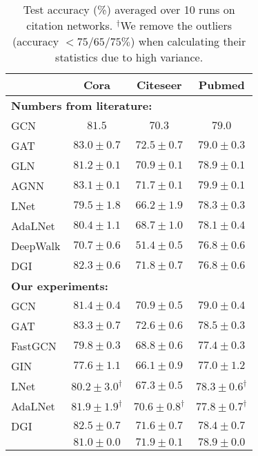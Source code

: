 \begin{table}[htb!]
\centering
        \small
        \caption{Test accuracy (\%) averaged over 10 runs on citation networks. $^\dagger$We remove the outliers (accuracy $< 75/65/75 \%$) when calculating their statistics due to high variance.}
        \label{table:citation-base}
        \begin{tabular}{l|c|c|c}
        \toprule
         & Cora & Citeseer & Pubmed \\ 
        \midrule
        \multicolumn{4}{l}{\textbf{Numbers from literature:}} \\
        GCN  & $81.5$ & $70.3$ & $79.0$  \\
        GAT  & $83.0 \pm 0.7$ & $72.5 \pm{0.7}$ & $79.0 \pm{0.3}$ \\
        GLN  & $81.2 \pm 0.1$ & $70.9 \pm{0.1}$ & $78.9 \pm{0.1}$ \\
        AGNN & $83.1 \pm 0.1$ & $71.7 \pm{0.1}$ & $79.9 \pm{0.1}$ \\
        LNet & $79.5 \pm 1.8$ & $66.2 \pm 1.9$  & $78.3 \pm 0.3$ \\
        AdaLNet & $80.4 \pm 1.1$ & $68.7 \pm 1.0$  & $78.1 \pm 0.4$ \\
        DeepWalk & $70.7 \pm 0.6$ & $51.4 \pm 0.5$ & $76.8 \pm 0.6$\\
        DGI & $82.3 \pm 0.6$ & $71.8 \pm 0.7$ & $76.8 \pm 0.6$ \\
         \midrule
        \multicolumn{4}{l}{\textbf{Our experiments:}} \\
        GCN & $81.4 \pm{0.4}$ & $70.9\pm 0.5$ & $79.0 \pm{0.4}$ \\
        GAT & $83.3 \pm{0.7}$ & $72.6 \pm{0.6}$ &  $78.5 \pm{0.3}$ \\
        FastGCN & $79.8 \pm{0.3}$ & $68.8 \pm{0.6} $ & $77.4 \pm{0.3}$ \\
        GIN & $77.6 \pm 1.1$ &  $66.1 \pm 0.9$ & $77.0 \pm 1.2$ \\
        LNet & $80.2 \pm 3.0^\dagger$ & $67.3 \pm 0.5$  & $78.3 \pm 0.6^\dagger$ \\
        AdaLNet & $81.9 \pm 1.9^\dagger$ & $70.6 \pm 0.8^\dagger$ & $77.8 \pm 0.7^\dagger$ \\
        DGI & $82.5 \pm 0.7$ & $71.6 \pm 0.7 $ & $78.4 \pm 0.7$\\
        {\color{modelblue} \method{}} & $81.0 \pm 0.0$ & $71.9 \pm 0.1$ & $78.9 \pm 0.0$ \\
         \bottomrule
        \end{tabular}
\end{table}
